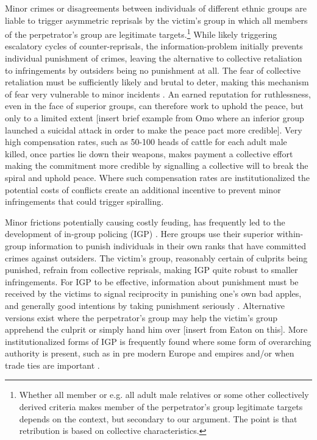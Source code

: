 \documentclass[12pt]{article}
\begin{document}
Minor crimes or disagreements between individuals of different ethnic groups are
liable to trigger asymmetric reprisals by the victim’s group in which all
members of the perpetrator’s group are legitimate targets.\footnote{ Whether all
	member or e.g. all adult male relatives or some other collectively
derived criteria makes member of the perpetrator’s group legitimate targets
depends on the context, but secondary to our argument. The point is that
retribution is based on collective characteristics.} While likely triggering
escalatory cycles of counter-reprisals, the information-problem initially
prevents individual punishment of crimes, leaving the alternative to collective
retaliation to infringements by outsiders being no punishment at all. The fear
of collective retaliation must be sufficiently likely and brutal to deter,
making this mechanism of fear very vulnerable to minor incidents
\citep{Fearon_1996}. An earned reputation for ruthlessness, even in the face of
superior groups, can therefore work to uphold the peace, but only to a limited
extent [insert brief example from Omo where an inferior group launched a
suicidal attack in order to make the peace pact more credible]. Very high
compensation rates, such as 50-100 heads of cattle for each adult male killed,
once parties lie down their weapons, makes payment a collective effort making
the commitment more credible by signalling a collective will to break the spiral
and uphold peace. Where such compensation rates are institutionalized the
potential costs of conflicts create an additional incentive to prevent minor
infringements that could trigger spiralling.  

Minor frictions potentially causing costly feuding, has frequently led to the
development of in-group policing (IGP) \citep[723]{Fearon_1996}. Here groups use
their superior within-group information to punish individuals in their own ranks
that have committed crimes against outsiders. The victim’s group, reasonably
certain of culprits being punished, refrain from collective reprisals, making
IGP quite robust to smaller infringements. For IGP to be effective, information
about punishment must be received by the victims to signal reciprocity in
punishing one’s own bad apples, and generally good intentions by taking
punishment seriously \citep{Fearon_1996}. Alternative versions exist where the
perpetrator’s group may help the victim’s group apprehend the culprit or simply
hand him over [insert from Eaton on this]. More institutionalized forms of IGP
is frequently found where some form of overarching authority is present, such as
in pre modern Europe and empires and/or when trade ties are important
\citep[728]{Fearon_1996}.
\end{document}
